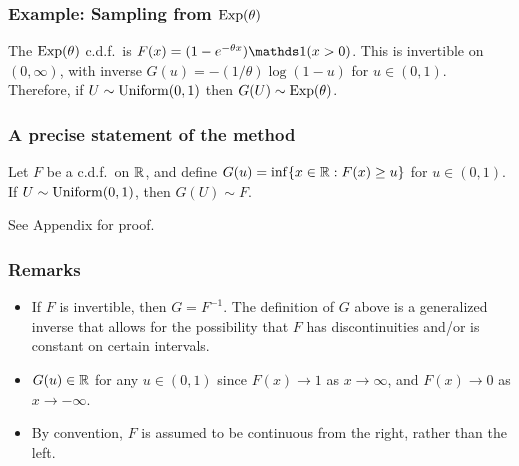 \documentclass[12pt]{article}
\begin{document}
\subsubsection{Example: Sampling from $\operatorname*{Exp}(\theta)$}
The $\operatorname*{Exp}(\theta)$ c.d.f.\ is $F(x) = (1-e^{-\theta x})\I(x>0)$. This is invertible on $(0,\infty)$, with inverse $G(u)=-(1/\theta)\log(1-u)$ for $u\in(0,1)$. Therefore, if $U\sim\operatorname*{Uniform}(0,1)$ then $G(U)\sim \operatorname*{Exp}(\theta)$.

\subsubsection{A precise statement of the method}

\begin{proposition}\label{proposition:inverse}
    Let $F$ be a c.d.f.\ on $\mathbb{R}$, and define $G(u) =\inf \{x\in\mathbb{R}: F(x)\geq u\}$ for $u\in(0,1)$. If $U\sim\operatorname*{Uniform}(0,1)$, then $G(U)\sim F$.
\end{proposition}
See Appendix for proof.

\subsubsection*{Remarks}
\begin{itemize}
\item If $F$ is invertible, then $G = F^{-1}$.  The definition of $G$ above is a generalized inverse that allows for the possibility that $F$ has discontinuities and/or is constant on certain intervals.
\item $G(u)\in\mathbb{R}$ for any $u\in(0,1)$ since $F(x)\to 1$ as $x\to\infty$, and $F(x)\to 0$ as $x\to-\infty$.
\item By convention, $F$ is assumed to be continuous from the right, rather than the left.
\end{itemize}



\end{document}
